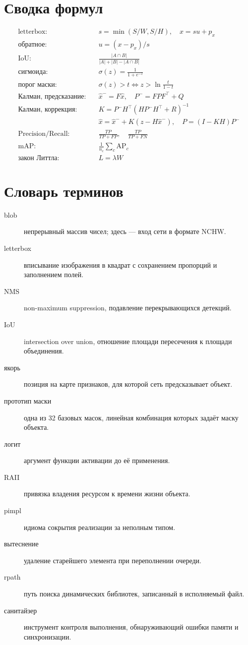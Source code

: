\documentclass[11pt,a4paper]{article}
\theoremstyle{definition}
\theoremstyle{remark}
\begin{document}
\appendix

\section{Сводка формул}

\begin{align}
  \text{letterbox:}\quad & s = \min(S/W, S/H), \quad x = su + p_x \\
  \text{обратное:}\quad & u = (x - p_x)/s \\
  \text{IoU:}\quad & \frac{|A \cap B|}{|A| + |B| - |A \cap B|} \\
  \text{сигмоида:}\quad & \sigma(z) = \frac{1}{1+e^{-z}} \\
  \text{порог маски:}\quad & \sigma(z) > t \iff z > \ln\frac{t}{1-t} \\
  \text{Калман, предсказание:}\quad & \hat{x}^- = F\hat{x}, \quad P^- = FPF^\top + Q \\
  \text{Калман, коррекция:}\quad & K = P^-H^\top(HP^-H^\top + R)^{-1} \\
  & \hat{x} = \hat{x}^- + K(z - H\hat{x}^-), \quad P = (I-KH)P^- \\
  \text{Precision/Recall:}\quad & \frac{TP}{TP+FP}, \quad \frac{TP}{TP+FN} \\
  \text{mAP:}\quad & \frac{1}{n_c}\sum_c \mathrm{AP}_c \\
  \text{закон Литтла:}\quad & L = \lambda W
\end{align}

\section{Словарь терминов}

\begin{description}
  \item[blob] непрерывный массив чисел; здесь --- вход сети в формате NCHW.
  \item[letterbox] вписывание изображения в квадрат с сохранением пропорций и
        заполнением полей.
  \item[NMS] non-maximum suppression, подавление перекрывающихся детекций.
  \item[IoU] intersection over union, отношение площади пересечения к площади
        объединения.
  \item[якорь] позиция на карте признаков, для которой сеть предсказывает
        объект.
  \item[прототип маски] одна из 32 базовых масок, линейная комбинация которых
        задаёт маску объекта.
  \item[логит] аргумент функции активации до её применения.
  \item[RAII] привязка владения ресурсом к времени жизни объекта.
  \item[pimpl] идиома сокрытия реализации за неполным типом.
  \item[вытеснение] удаление старейшего элемента при переполнении очереди.
  \item[rpath] путь поиска динамических библиотек, записанный в исполняемый
        файл.
  \item[санитайзер] инструмент контроля выполнения, обнаруживающий ошибки
        памяти и синхронизации.
\end{description}
\end{document}
